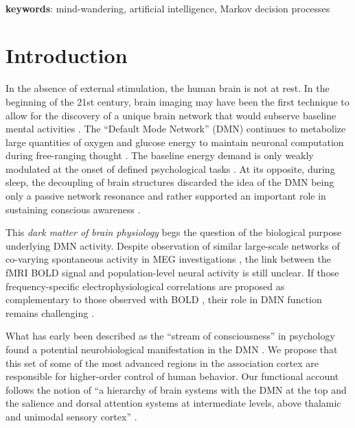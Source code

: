 \documentclass[10pt,letterpaper]{article}
\begin{document}
\textbf{\\keywords}: mind-wandering, artificial intelligence, Markov decision processes



\section{Introduction}
%
In the absence of external stimulation, the human brain is not at rest.
In the beginning of the 21st century,
brain imaging may have been the first technique
to allow for the discovery of a unique brain network that would subserve
baseline mental activities
\citep{raichle2001pnas, randy2008, bzdok2015resting}.
The ``Default Mode Network'' (DMN) continues
to metabolize large quantities of
oxygen and glucose energy to maintain
neuronal computation
during free-ranging thought
\citep{kenet2003spontaneously, fiser2004small}.
The baseline energy demand is only weakly modulated
at the onset of defined psychological tasks \citep{raichle_baseline}.
At its opposite, during sleep, the
decoupling of brain structures discarded the idea of the DMN being
only a passive network resonance and rather supported an
important role in sustaining conscious awareness \citep{horovitz2009decoupling}.



This \textit{dark matter of brain physiology}
\citep{raichle2006brain} begs the question
of the biological purpose underlying DMN activity.
Despite observation of similar large-scale networks of co-varying spontaneous activity in MEG investigations \citep{de2010temporal,brookes2011investigating,baker2014fast}, the link between the fMRI BOLD signal and population-level neural activity is still unclear. If those frequency-specific electrophysiological correlations are proposed as complementary to those observed with BOLD \citep{hipp2015bold}, their role in DMN function remains challenging \citep{maldjian2014graph}.


What has early been described as the ``stream of consciousness''
in psychology \citep{james1890principles}
found a potential neurobiological manifestation
in the DMN
\citep{shul1997, raichle2001pnas}.
We propose that this set of some of the most advanced regions in
the association cortex \citep{mesulam1998sensation, margulies2016situating}
are responsible for higher-order control of human behavior.
Our functional account follows the notion of
``a hierarchy of brain systems with
the DMN at the top and the salience and dorsal attention systems
at intermediate levels, above thalamic and unimodal sensory
cortex'' \citep{carhart2010default}.
\end{document}
